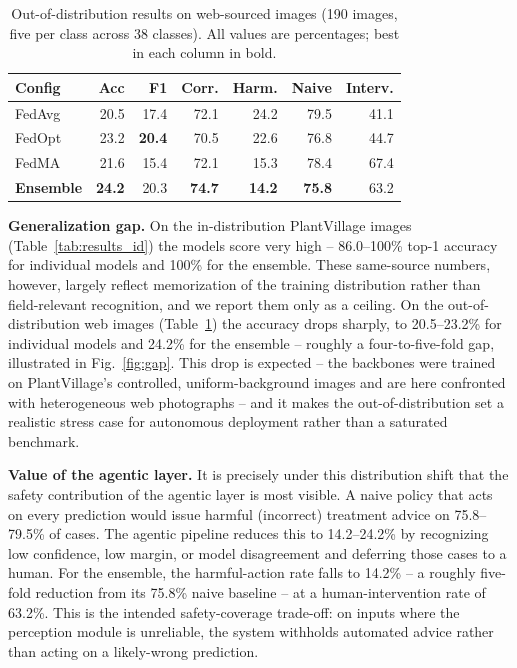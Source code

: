 \documentclass[conference]{IEEEtran}
\begin{document}
\begin{table}[t]
\centering
\caption{Out-of-distribution results on web-sourced images (190 images, five per class across 38 classes). All values are percentages; best in each column in bold.}
\label{tab:results_ood}
\small
\setlength{\tabcolsep}{4pt}
\begin{tabular}{lrrrrrr}
\toprule
\textbf{Config} & \textbf{Acc} & \textbf{F1} & \textbf{Corr.} & \textbf{Harm.} & \textbf{Naive} & \textbf{Interv.} \\
\midrule
FedAvg & 20.5 & 17.4 & 72.1 & 24.2 & 79.5 & 41.1 \\
FedOpt & 23.2 & \textbf{20.4} & 70.5 & 22.6 & 76.8 & 44.7 \\
FedMA & 21.6 & 15.4 & 72.1 & 15.3 & 78.4 & 67.4 \\
\textbf{Ensemble} & \textbf{24.2} & 20.3 & \textbf{74.7} & \textbf{14.2} & \textbf{75.8} & 63.2 \\
\bottomrule
\end{tabular}
\end{table}

\textbf{Generalization gap.} On the in-distribution PlantVillage images (Table~\ref{tab:results_id}) the models score very high -- 86.0--100\% top-1 accuracy for individual models and 100\% for the ensemble. These same-source numbers, however, largely reflect memorization of the training distribution rather than field-relevant recognition, and we report them only as a ceiling. On the out-of-distribution web images (Table~\ref{tab:results_ood}) the accuracy drops sharply, to 20.5--23.2\% for individual models and 24.2\% for the ensemble -- roughly a four-to-five-fold gap, illustrated in Fig.~\ref{fig:gap}. This drop is expected -- the backbones were trained on PlantVillage's controlled, uniform-background images and are here confronted with heterogeneous web photographs -- and it makes the out-of-distribution set a realistic stress case for autonomous deployment rather than a saturated benchmark.

\textbf{Value of the agentic layer.} It is precisely under this distribution shift that the safety contribution of the agentic layer is most visible. A naive policy that acts on every prediction would issue harmful (incorrect) treatment advice on 75.8--79.5\% of cases. The agentic pipeline reduces this to 14.2--24.2\% by recognizing low confidence, low margin, or model disagreement and deferring those cases to a human. For the ensemble, the harmful-action rate falls to 14.2\% -- a roughly five-fold reduction from its 75.8\% naive baseline -- at a human-intervention rate of 63.2\%. This is the intended safety-coverage trade-off: on inputs where the perception module is unreliable, the system withholds automated advice rather than acting on a likely-wrong prediction.
\end{document}
